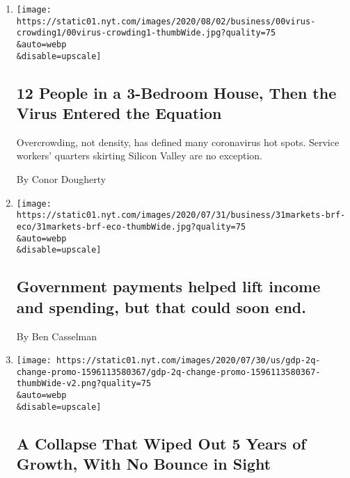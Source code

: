 \begin{enumerate}
\def\labelenumi{\arabic{enumi}.}
\item
  \href{/2020/08/01/business/economy/housing-overcrowding-coronavirus.html}{}

  \texttt{[image: https://static01.nyt.com/images/2020/08/02/business/00virus-crowding1/00virus-crowding1-thumbWide.jpg?quality=75\\\&auto=webp\\\&disable=upscale]}

  \hypertarget{12-people-in-a-3-bedroom-house-then-the-virus-entered-the-equation}{%
  \subsection{12 People in a 3-Bedroom House, Then the Virus Entered the
  Equation}\label{12-people-in-a-3-bedroom-house-then-the-virus-entered-the-equation}}

  Overcrowding, not density, has defined many coronavirus hot spots.
  Service workers' quarters skirting Silicon Valley are no exception.

  By Conor Dougherty
\item
  \href{/live/2020/07/31/business/stock-market-today-coronavirus/government-payments-helped-lift-income-and-spending-but-that-could-soon-end}{}

  \texttt{[image: https://static01.nyt.com/images/2020/07/31/business/31markets-brf-eco/31markets-brf-eco-thumbWide.jpg?quality=75\\\&auto=webp\\\&disable=upscale]}

  \hypertarget{government-payments-helped-lift-income-and-spending-but-that-could-soon-end}{%
  \subsection{Government payments helped lift income and spending, but
  that could soon
  end.}\label{government-payments-helped-lift-income-and-spending-but-that-could-soon-end}}

  By Ben Casselman
\item
  \href{/2020/07/30/business/economy/q2-gdp-coronavirus-economy.html}{}

  \texttt{[image: https://static01.nyt.com/images/2020/07/30/us/gdp-2q-change-promo-1596113580367/gdp-2q-change-promo-1596113580367-thumbWide-v2.png?quality=75\\\&auto=webp\\\&disable=upscale]}

  \hypertarget{a-collapse-that-wiped-out-5-years-of-growth-with-no-bounce-in-sight}{%
  \subsection{A Collapse That Wiped Out 5 Years of Growth, With No
  Bounce in
  Sight}\label{a-collapse-that-wiped-out-5-years-of-growth-with-no-bounce-in-sight}}


\end{enumerate}
